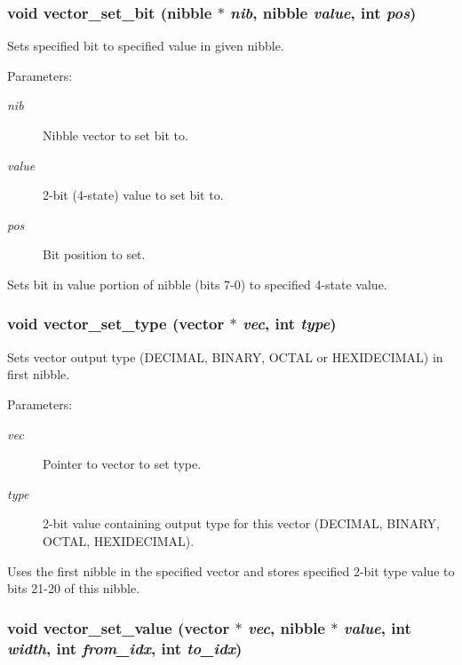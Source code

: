 \subsubsection{\setlength{\rightskip}{0pt plus 5cm}void vector\_\-set\_\-bit ({\bf nibble} $\ast$ {\em nib}, {\bf nibble} {\em value}, int {\em pos})}\label{vector_8h_a9}


Sets specified bit to specified value in given nibble.

\begin{Desc}
\item[Parameters: ]\par
\begin{description}
\item[{\em 
nib}]Nibble vector to set bit to. \item[{\em 
value}]2-bit (4-state) value to set bit to. \item[{\em 
pos}]Bit position to set.\end{description}
\end{Desc}
Sets bit in value portion of nibble (bits 7-0) to specified 4-state value. 
\subsubsection{\setlength{\rightskip}{0pt plus 5cm}void vector\_\-set\_\-type ({\bf vector} $\ast$ {\em vec}, int {\em type})}\label{vector_8h_a11}


Sets vector output type (DECIMAL, BINARY, OCTAL or HEXIDECIMAL) in first nibble.

\begin{Desc}
\item[Parameters: ]\par
\begin{description}
\item[{\em 
vec}]Pointer to vector to set type. \item[{\em 
type}]2-bit value containing output type for this vector (DECIMAL, BINARY, OCTAL, HEXIDECIMAL).\end{description}
\end{Desc}
Uses the first nibble in the specified vector and stores specified 2-bit type value to bits 21-20 of this nibble. 
\subsubsection{\setlength{\rightskip}{0pt plus 5cm}void vector\_\-set\_\-value ({\bf vector} $\ast$ {\em vec}, {\bf nibble} $\ast$ {\em value}, int {\em width}, int {\em from\_\-idx}, int {\em to\_\-idx})}\label{vector_8h_a10}


